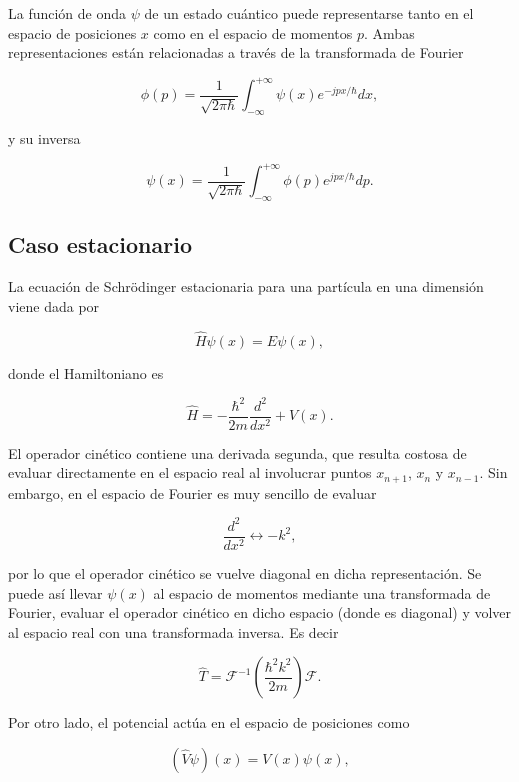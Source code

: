 \documentclass[11pt,a4paper,twoside,pdf]{article}
\numberwithin{equation}{section}
\begin{document}
La función de onda $\psi$ de un estado cuántico puede representarse tanto en el espacio de posiciones $x$ como en el espacio de momentos $p$. Ambas representaciones están relacionadas a través de la transformada de Fourier \cite{sakurai2020modern}

$$
    \phi(p) = \frac{1}{\sqrt{2\pi \hbar}} \int_{-\infty}^{+\infty} \psi(x) e^{-jpx/\hbar} dx,
$$

y su inversa

$$
    \psi(x) = \frac{1}{\sqrt{2\pi \hbar}} \int_{-\infty}^{+\infty} \phi(p) e^{jpx/\hbar} dp.
$$


\subsection{Caso estacionario}

La ecuación de Schrödinger estacionaria para una partícula en una dimensión viene dada por

\begin{equation}
\hat H \psi(x) = E \psi(x),
\end{equation}

donde el Hamiltoniano es

\begin{equation}
\hat H =
-\frac{\hbar^2}{2m}\frac{d^2}{dx^2}
+ V(x).
\end{equation}

El operador cinético contiene una derivada segunda, que resulta costosa de evaluar directamente en el espacio real al involucrar puntos $x_{n+1}$, $x_{n}$ y $x_{n-1}$. Sin embargo, en el espacio de Fourier es muy sencillo de evaluar

\begin{equation}
\frac{d^2}{dx^2} \longleftrightarrow -k^2,
\end{equation}

por lo que el operador cinético se vuelve diagonal en dicha representación. Se puede así llevar $\psi(x)$ al espacio de momentos mediante una transformada de Fourier, evaluar el operador cinético en dicho espacio (donde es diagonal) y volver al espacio real con una transformada inversa. Es decir

\begin{equation}
\hat T
=
\mathcal F^{-1}
\left(
\frac{\hbar^2 k^2}{2m}
\right)
\mathcal F.
\end{equation}


Por otro lado, el potencial actúa en el espacio de posiciones como

\begin{equation}
(\hat V\psi)(x)=V(x)\psi(x),
\end{equation}
\end{document}
